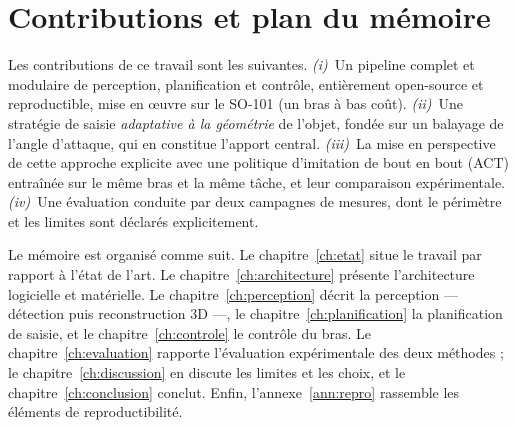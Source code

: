 \section{Contributions et plan du mémoire}

Les contributions de ce travail sont les suivantes. \emph{(i)}~Un pipeline complet et modulaire de perception, planification et contrôle, entièrement open-source et reproductible, mise en œuvre sur le SO-101 (un bras à bas coût). \emph{(ii)}~Une stratégie de saisie \emph{adaptative à la géométrie} de l'objet, fondée sur un balayage de l'angle d'attaque, qui en constitue l'apport central. \emph{(iii)}~La mise en perspective de cette approche explicite avec une politique d'imitation de bout en bout (ACT) entraînée sur le même bras et la même tâche, et leur comparaison expérimentale. \emph{(iv)}~Une évaluation conduite par deux campagnes de mesures, dont le périmètre et les limites sont déclarés explicitement.

Le mémoire est organisé comme suit. Le chapitre~\ref{ch:etat} situe le travail par rapport à l'état de l'art. Le chapitre~\ref{ch:architecture} présente l'architecture logicielle et matérielle. Le chapitre~\ref{ch:perception} décrit la perception --- détection puis reconstruction 3D ---, le chapitre~\ref{ch:planification} la planification de saisie, et le chapitre~\ref{ch:controle} le contrôle du bras. Le chapitre~\ref{ch:evaluation} rapporte l'évaluation expérimentale des deux méthodes ; le chapitre~\ref{ch:discussion} en discute les limites et les choix, et le chapitre~\ref{ch:conclusion} conclut. Enfin, l'annexe~\ref{ann:repro} rassemble les éléments de reproductibilité.
